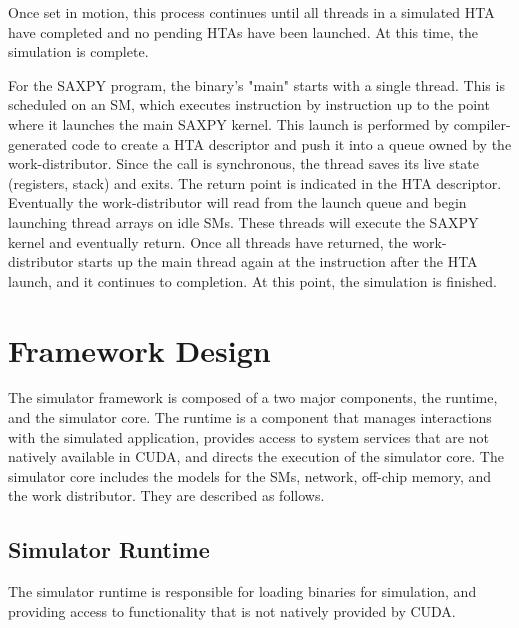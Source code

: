 \documentclass[conference, 10pt]{IEEEtran}
\begin{document}
Once set in motion, this process continues until all threads in a simulated HTA
have completed and no pending HTAs have been launched.  At this time, the
simulation is complete.

For the SAXPY program, the binary's "main" starts with a single thread.  This is
scheduled on an SM, which executes instruction by instruction up to the point
where it launches the main SAXPY kernel.  This launch is performed by
compiler-generated code to create a HTA descriptor and push it into a queue
owned by the work-distributor.  Since the call is synchronous, the thread
saves its live state (registers, stack) and exits.  The return point is
indicated in the HTA descriptor.  Eventually the work-distributor will read from
the launch queue and begin launching thread arrays on idle SMs.  These threads
will execute the SAXPY kernel and eventually return.  Once all threads have 
returned, the work-distributor starts up the main thread again at the
instruction after the HTA launch, and it continues to completion.  At this
point, the simulation is finished.  


\section{Framework Design}
\label{sec:framework-design}

The simulator framework is composed of a two major components, the runtime,
and the simulator core.  The runtime is a component that manages
interactions with the simulated application, provides access to system services
that are not natively available in CUDA, and directs the execution of the
simulator core.  The simulator core includes the models for the SMs, network, 
off-chip memory, and the work distributor.  They are described as follows.

%
%

\subsection{Simulator Runtime}

The simulator runtime is responsible for loading binaries for simulation, and
providing access to functionality that is not natively provided by CUDA.
\end{document}
